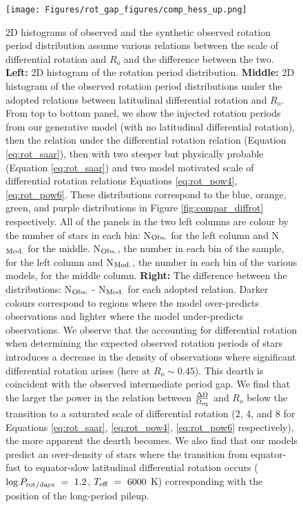 \begin{figure}
\centering
 \texttt{[image: Figures/rot\_gap\_figures/comp\_hess\_up.png]}
 \caption[2D histograms of observed and the synthetic observed rotation period distribution assuming various relations between the scale of differential rotation and $R_o$ and the difference between the two.]{
2D histograms of observed and the synthetic observed rotation period distribution assume various relations between the scale of differential rotation and $R_o$ and the difference between the two.
\textbf{Left:} 2D histogram of the \citet{mcquillan_rotation_2014} rotation period distribution.
\textbf{Middle:} 2D histogram of the observed rotation period distributions under the adopted relations between latitudinal differential rotation and $R_o$. From top to bottom panel, we show the injected rotation periods from our generative model (with no latitudinal differential rotation), then the relation under the \citet{saar_starspots_2011} differential rotation relation (Equation \ref{eq:rot_saar}), then with two steeper but physically probable (Equation \ref{eq:rot_saar}) and two model motivated \citep{brun_powering_2022} scale of differential rotation relations Equations \ref{eq:rot_pow4}, \ref{eq:rot_pow6}.
These distributions correspond to the blue, orange, green, and purple distributions in Figure \ref{fig:compar_diffrot} respectively.
All of the panels in the two left columns are colour by the number of stars in each bin: N$_{\rm{Obs.}}$ for the left column and N$_{\rm{Mod.}}$ for the middle.
N$_{\rm{Obs.}}$, the number in each bin of the \citet{mcquillan_rotation_2014} sample, for the left column and N$_{\rm{Mod.}}$, the number in each bin of the various models, for the middle column.
\textbf{Right:} The difference between the distributions: N$_{\rm{Obs.}}$ - N$_{\rm{Mod.}}$ for each adopted relation.
Darker colours correspond to regions where the model over-predicts observations and lighter where the model under-predicts observations. We observe that the accounting for differential rotation when determining the expected observed rotation periods of stars introduces a decrease in the density of observations where significant differential rotation arises (here at $R_o \sim 0.45$). This dearth is coincident with the observed intermediate period gap. We find that the larger the power in the relation between $\frac{\Delta\Omega}{\Omega_{\rm{eq}}}$ and $R_o$ below the transition to a saturated scale of differential rotation (2, 4, and 8 for Equations \ref{eq:rot_saar}, \ref{eq:rot_pow4}, \ref{eq:rot_pow6} respectively), the more apparent the dearth becomes. We also find that our models predict an over-density of stars where the transition from equator-fast to equator-slow latitudinal differential rotation occurs ($\log P_{\rm{rot}/days} \ = \ 1.2$, $T_{\rm{eff}} \ = \ 6000$ K) corresponding with the position of the long-period pileup.}
 \label{fig:comp_hess}
\end{figure}

